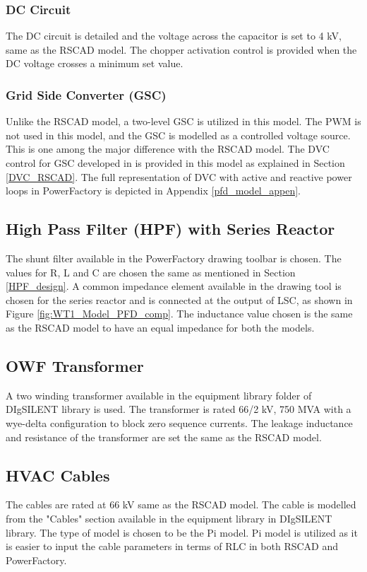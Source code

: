 \subsubsection{DC Circuit}
The DC circuit is detailed and the voltage across the capacitor is set to 4 kV, same as the RSCAD model. The chopper activation control is provided when the \gls{DC} voltage crosses a minimum set value. 

\subsubsection{Grid Side Converter (GSC)}
Unlike the RSCAD model, a two-level \gls{GSC} is utilized in this model. The \gls{PWM} is not used in this model, and the \gls{GSC} is modelled as a controlled voltage source. This is one among the major difference with the RSCAD model. The \gls{DVC} control for \gls{GSC} developed in \cite{korai_dynamic_2019} is provided in this model as explained in Section \ref{DVC_RSCAD}. The full representation of \gls{DVC} with active and reactive power loops in PowerFactory is depicted in Appendix \ref{pfd_model_appen}. 

\subsection{High Pass Filter (HPF) with Series Reactor}
The shunt filter available in the PowerFactory drawing toolbar is chosen. The values for R, L and C are chosen the same as mentioned in Section \ref{HPF_design}. A common impedance element available in the drawing tool is chosen for the series reactor and is connected at the output of \gls{LSC}, as shown in Figure \ref{fig:WT1_Model_PFD_comp}. The inductance value chosen is the same as the RSCAD model to have an equal impedance for both the models.  

\subsection{OWF Transformer}
A two winding transformer available in the equipment library folder of DIgSILENT library is used. The transformer is rated 66/2 kV, 750 MVA with a wye-delta configuration to block zero sequence currents. The leakage inductance and resistance of the transformer are set the same as the RSCAD model.

\subsection{HVAC Cables}
The cables are rated at 66 kV same as the RSCAD model. The cable is modelled from the "Cables" section available in the equipment library in DIgSILENT library. The type of model is chosen to be the Pi model. %
Pi model is utilized as it is easier to input the cable parameters in terms of RLC in both RSCAD and PowerFactory.

